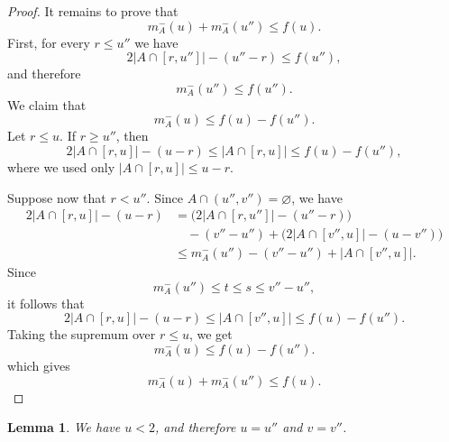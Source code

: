 \documentclass[11pt,reqno]{amsart}
\newtheorem{lem}[thm]{Lemma}
\theoremstyle{definition}
\def\F#1{f(#1)}
\begin{document}
\begin{proof}
    It remains to prove that
    $$
        m_A^-(u)+m_A^-(u'')\leq \F{u}.
    $$
    First, for every $r\leq u''$ we have
    $$
        2|A\cap[r,u'']|-(u''-r)\leq \F{u''},
    $$
    and therefore
    $$
        m_A^-(u'')\leq \F{u''}.
    $$
    We claim that
    $$
        m_A^-(u)\leq \F{u}-\F{u''}.
    $$
    Let $r\leq u$. If $r\geq u''$, then
    $$
        2|A\cap[r,u]|-(u-r)
        \leq |A\cap[r,u]|
        \leq \F{u}-\F{u''},
    $$
    where we used only $|A\cap[r,u]|\leq u-r$.

    Suppose now that $r<u''$. Since $A\cap(u'',v'')=\varnothing$, we have
    \begin{align*}
        2|A\cap[r,u]|-(u-r)
        &=
        \bigl(2|A\cap[r,u'']|-(u''-r)\bigr)\\
        &\quad
        -(v''-u'')
        +\bigl(2|A\cap[v'',u]|-(u-v'')\bigr)\\
        &\leq
        m_A^-(u'')-(v''-u'')+|A\cap[v'',u]|.
    \end{align*}
    Since
    $$
        m_A^-(u'')\leq t\leq s\leq v''-u'',
    $$
    it follows that
    $$
        2|A\cap[r,u]|-(u-r)
        \leq |A\cap[v'',u]|
        \leq \F{u}-\F{u''}.
    $$
    Taking the supremum over $r\leq u$, we get
    $$
        m_A^-(u)\leq \F{u}-\F{u''}.
    $$
which gives
    $$
        m_A^-(u)+m_A^-(u'')\leq \F{u}.
    $$
\end{proof}

\begin{lem}
    We have $u < 2$, and therefore $u = u''$ and $v = v''$. 
\end{lem}
\end{document}
